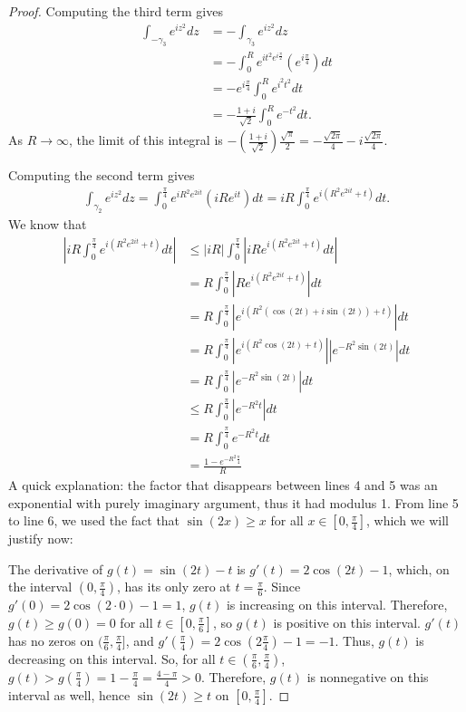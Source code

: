 \documentclass[10pt]{article}
\begin{document}
\begin{enumerate}
\begin{proof}
Computing the third term gives
\begin{align*}
\int_{-\gamma_3} e^{iz^2}dz &= -\int_{\gamma_3} e^{iz^2}dz
\\
&= -\int_0^R e^{it^2 e^{i\frac{\pi}{2}}} (e^{i\frac{\pi}{4}} ) dt
\\
&= -e^{i\frac{\pi}{4}} \int_0^R e^{i^2t^2} dt
\\
&= -\frac{1+i}{\sqrt{2}} \int_0^R e^{-t^2} dt.
\end{align*}
As $R \rightarrow \infty$, the limit of this integral is $-(\frac{1+i}{\sqrt{2}})\frac{\sqrt{\pi}}{2} = -\frac{\sqrt{2\pi}}{4} - i\frac{\sqrt{2\pi}}{4}$.

Computing the second term gives
\begin{align*}
\int_{\gamma_2} e^{iz^2}dz = \int_0^{\frac{\pi}{4}} e^{i R^2e^{2it}} (iR e^{it}) dt
=  iR \int_0^{\frac{\pi}{4}} e^{i (R^2e^{2it} + t)} dt.
\end{align*}
We know that
\begin{align}
\left| iR \int_0^{\frac{\pi}{4}} e^{i (R^2e^{2it} + t)} dt \right|
&\leq |iR| \int_0^{\frac{\pi}{4}} \left| iR e^{i (R^2e^{2it} + t)} dt \right|
\\
&= R \int_0^{\frac{\pi}{4}} \left| R e^{i (R^2e^{2it} + t)} \right| dt
\\
&= R \int_0^{\frac{\pi}{4}} \left| e^{i (R^2(\cos(2t) + i \sin(2t)) + t)} \right| dt
\\
&= R \int_0^{\frac{\pi}{4}} \left| e^{i(R^2\cos(2t) + t)} \right| \left| e^{-R^2\sin(2t)} \right| dt
\\
&= R \int_0^{\frac{\pi}{4}} \left| e^{-R^2\sin(2t)} \right| dt
\\
&\leq R \int_0^{\frac{\pi}{4}} \left| e^{-R^2t} \right| dt
\\
&= R \int_0^{\frac{\pi}{4}} e^{-R^2t} dt
\\
&= \frac{1 - e^{-R^2\frac{\pi}{4}}}{R}
\end{align}
A quick explanation: the factor that disappears between lines 4 and 5 was an exponential with purely imaginary argument, thus it had modulus 1.  From line 5 to line 6, we used the fact that $\sin(2x) \geq x$ for all $x \in [0,\frac{\pi}{4}]$, which we will justify now:

The derivative of $g(t) = \sin(2t) - t$ is $g'(t) = 2\cos(2t) - 1$, which, on the interval $(0,\frac{\pi}{4})$, has its only zero at $t = \frac{\pi}{6}$.  Since $g'(0) = 2\cos(2\cdot 0) - 1 = 1$, $g(t)$ is increasing on this interval.  Therefore, $g(t) \geq g(0) = 0$ for all $t \in [0, \frac{\pi}{6}]$, so $g(t)$ is positive on this interval.  $g'(t)$ has no zeros on $(\frac{\pi}{6}, \frac{\pi}{4}]$, and $g'(\frac{\pi}{4}) = 2\cos(2\frac{\pi}{4}) - 1 = -1$.  Thus, $g(t)$ is decreasing on this interval.  So, for all $t \in (\frac{\pi}{6}, \frac{\pi}{4})$, $g(t) > g(\frac{\pi}{4}) = 1 - \frac{\pi}{4} = \frac{4 - \pi}{4} > 0$.  Therefore, $g(t)$ is nonnegative on this interval as well, hence $\sin(2t) \geq t$ on $[0, \frac{\pi}{4}]$. 


\end{proof}
\end{enumerate}
\end{document}
